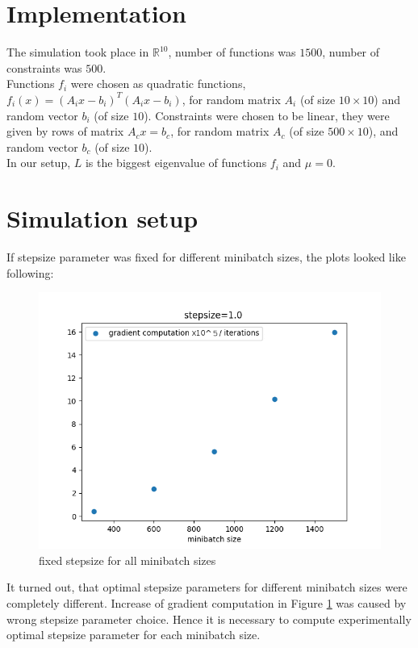 \documentclass[11pt]{book}
\newcommand{\R}{\mathbb{R}}
\theoremstyle{definition}
\begin{document}
	
	\section{Implementation}
	
	The simulation took place in $\R^{10}$, number of functions was $1500$, number of constraints was $500$.\\
	
	Functions $f_i$ were chosen as quadratic functions, $f_i(x) = (A_ix-b_i)^T(A_ix-b_i)$, for random matrix $A_i$ (of size $10 \times 10$) and random vector $b_i$ (of size $10$). Constraints were chosen to be linear, they were given by rows of matrix $A_cx=b_c$, for random matrix $A_c$ (of size $500 \times 10$), and random vector $b_c$ (of size $10$).\\
	
	In our setup, $L$ is the biggest eigenvalue of functions $f_i$ and $\mu=0$.
	
	\section{Simulation setup}
	
	If stepsize parameter was fixed for different minibatch sizes, the plots looked like following:
	
	\begin{figure}[H]
		\centering
		\includegraphics[width=.7\linewidth]{fixed_stepsize.png}
		\caption{fixed stepsize for all minibatch sizes}
		\label{fig:fixed stepsize}
	\end{figure}
	
	It turned out, that optimal stepsize parameters for different minibatch sizes were completely different. Increase of gradient computation in Figure \ref{fig:fixed stepsize} was caused by wrong stepsize parameter choice. Hence it is necessary to compute experimentally optimal stepsize parameter for each minibatch size.\\
	
\end{document}
